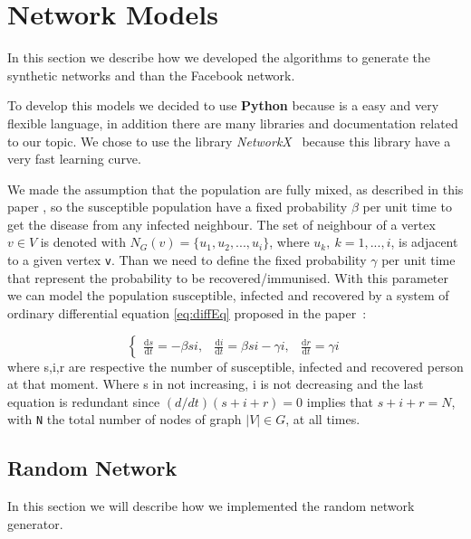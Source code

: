 
\section{Network Models}
    In this section we describe how we developed the algorithms to generate the synthetic networks and than the Facebook network.
    
    To develop this models we decided to use \textbf{Python} because is a easy and very flexible language, in addition there are many libraries and documentation related to our topic.
    We chose to use the library \textit{NetworkX}~\cite{NetworkX} because this library have a very fast learning curve.
    
    We made the assumption that the population are fully mixed, as described in this paper \cite{witten2007simulations}, so the susceptible population have a fixed probability $\beta$ per unit time to get the disease from any infected neighbour. The set of neighbour of a vertex $v \in V$ is denoted with $N_G(v) = \{u_1, u_2, ..., u_i \}$, where $u_k,~k=1,...,i$, is adjacent to a given vertex \verb|v|.
    Than we need to define the fixed probability $\gamma$ per unit time that represent the probability to be recovered/immunised.
    With this parameter we can model the population susceptible, infected and recovered by a system of ordinary differential equation \ref{eq:diffEq} proposed in the paper~\cite{witten2007simulations}:
    
    \begin{equation}\label{eq:diffEq}
      \left\{\begin{matrix}
        \frac{\mathrm{d} s}{\mathrm{d} t} = -\beta si, & 
        \frac{\mathrm{d} i}{\mathrm{d} t} = \beta si - \gamma i,& 
        \frac{\mathrm{d} r}{\mathrm{d} t} = \gamma i
    \end{matrix}\right.
    \end{equation}
    where s,i,r are respective the number of susceptible, infected and recovered person at that moment.
    Where s in not increasing, i is not decreasing and the last equation is redundant since $(d/dt)(s + i + r) = 0$ implies that $s +i +r = N$, with \verb|N| the total number of nodes of graph $|V| \in G$, at all times.
    
    \subsection{Random Network}
        In this section we will describe how we implemented the random network generator.
        
